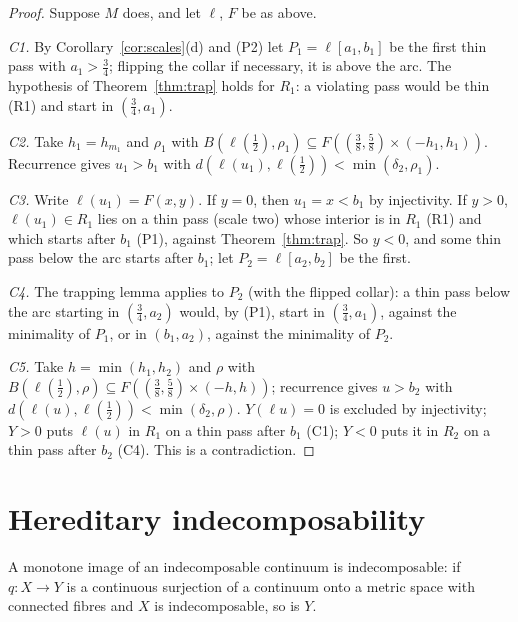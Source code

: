 \begin{proof}
Suppose $M$ does, and let $\ell$, $F$ be as above.

\emph{C1.} By Corollary~\ref{cor:scales}(d) and (P2) let $P_1=\ell[a_1,b_1]$ be the first thin pass with $a_1>\frac34$; flipping the collar if
necessary, it is above the arc. The hypothesis of Theorem~\ref{thm:trap} holds for $R_1$: a violating pass would be thin (R1) and start in
$(\frac34,a_1)$.

\emph{C2.} Take $h_1=h_{m_1}$ and $\rho_1$ with $B(\ell(\frac12),\rho_1)\subseteq F((\frac38,\frac58)\times(-h_1,h_1))$. Recurrence gives $u_1>b_1$ with
$d(\ell(u_1),\ell(\frac12))<\min(\delta_2,\rho_1)$.

\emph{C3.} Write $\ell(u_1)=F(x,y)$. If $y=0$, then $u_1=x<b_1$ by injectivity. If $y>0$, $\ell(u_1)\in R_1$ lies on a thin pass (scale two) whose
interior is in $R_1$ (R1) and which starts after $b_1$ (P1), against Theorem~\ref{thm:trap}. So $y<0$, and some thin pass below the arc starts after
$b_1$; let $P_2=\ell[a_2,b_2]$ be the first.

\emph{C4.} The trapping lemma applies to $P_2$ (with the flipped collar): a thin pass below the arc starting in $(\frac34,a_2)$ would, by (P1),
start in $(\frac34,a_1)$, against the minimality of $P_1$, or in $(b_1,a_2)$, against the minimality of $P_2$.

\emph{C5.} Take $h=\min(h_1,h_2)$ and $\rho$ with $B(\ell(\frac12),\rho)\subseteq F((\frac38,\frac58)\times(-h,h))$; recurrence gives $u>b_2$ with
$d(\ell(u),\ell(\frac12))<\min(\delta_2,\rho)$. $Y(\ell u)=0$ is excluded by injectivity; $Y>0$ puts $\ell(u)$ in $R_1$ on a thin pass after $b_1$ (C1);
$Y<0$ puts it in $R_2$ on a thin pass after $b_2$ (C4). This is a contradiction.
\end{proof}


\section{Hereditary indecomposability}

\begin{lemma}\label{lem:monotone-image}
A monotone image of an indecomposable continuum is indecomposable: if $q\colon X\to Y$ is a continuous surjection of a continuum onto a metric space
with connected fibres and $X$ is indecomposable, so is $Y$.
\end{lemma}

